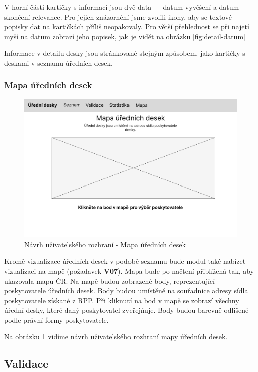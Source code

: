 V horní části kartičky s informací jsou dvě data --- datum vyvěšení a datum skončení relevance. Pro jejich znázornění jsme zvolili ikony, aby se textové popisky dat na kartičkách příliš neopakovaly. Pro větší přehlednost se při najetí myší na datum zobrazí jeho popisek, jak je vidět na obrázku \ref{fig:detail-datum}



Informace v detailu desky jsou stránkované stejným způsobem, jako kartičky s deskami v seznamu úředních desek.

\subsubsection{Mapa úředních desek}

\begin{figure} 
\includegraphics[width=\textwidth, frame]{cs/obrazky/wireframes/wireframe_mapa.pdf}
\caption{Návrh uživatelského rozhraní - Mapa úředních desek}
\label{fig:mapa}
\end{figure}

Kromě vizualizace úředních desek v podobě seznamu bude modul také nabízet vizualizaci na mapě (požadavek \textbf{V07}). Mapa bude po načtení přiblížená tak, aby ukazovala mapu ČR. Na mapě budou zobrazené body, reprezentující poskytovatele úředních desek. Body budou umístěné na souřadnice adresy sídla poskytovatele získané z RPP. Při kliknutí na bod v mapě se zobrazí všechny úřední desky, které daný poskytovatel zveřejňuje. Body budou barevně odlišené podle právní formy poskytovatele.

Na obrázku \ref{fig:mapa} vidíme návrh uživatelského rozhraní mapy úředních desek.


\subsection{Validace}

